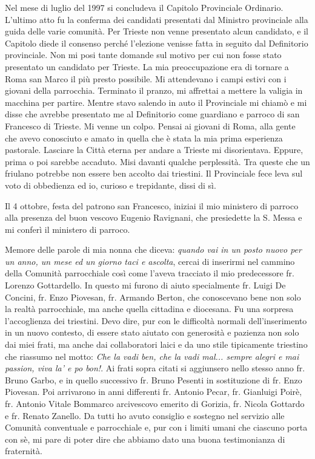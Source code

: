 \noindent Nel mese di luglio del 1997 si concludeva il Capitolo Provinciale Ordinario. L’ultimo atto fu la 
conferma dei candidati presentati dal Ministro provinciale alla guida delle varie comunità. Per 
Trieste non venne presentato alcun candidato, e il Capitolo diede il consenso perché l’elezione 
venisse fatta in seguito dal Definitorio provinciale. Non mi posi tante domande sul motivo per 
cui non fosse stato presentato un candidato per Trieste. La mia preoccupazione era di tornare a 
Roma san Marco il più presto possibile. Mi attendevano i campi estivi con i giovani della 
parrocchia. Terminato il pranzo, mi affrettai a mettere la valigia in macchina per partire. Mentre 
stavo salendo in auto il Provinciale mi chiamò e mi disse che avrebbe presentato me al 
Definitorio come guardiano e parroco di san Francesco di Trieste. Mi venne un colpo. Pensai ai 
giovani di Roma, alla gente che avevo conosciuto e amato in quella che è stata la mia prima 
esperienza pastorale. Lasciare la Città eterna per andare a Trieste mi disorientava. Eppure, prima 
o poi sarebbe accaduto. Misi davanti qualche perplessità. Tra queste che un friulano potrebbe 
non essere ben accolto dai triestini. Il Provinciale fece leva sul voto di obbedienza ed io, curioso 
e trepidante, dissi di sì.

Il 4 ottobre, festa del patrono san Francesco, iniziai il mio ministero di parroco alla presenza del 
buon vescovo Eugenio Ravignani, che presiedette la S. Messa e mi conferì il ministero di 
parroco.

Memore delle parole di mia nonna che diceva: \textit{quando vai in un posto nuovo per un anno, un
mese ed un giorno taci e ascolta}, cercai di inserirmi nel cammino della Comunità parrocchiale
così come l’aveva tracciato il mio predecessore fr. Lorenzo Gottardello. In questo mi furono di 
aiuto specialmente fr. Luigi De Concini, fr. Enzo Piovesan, fr. Armando Berton, che 
conoscevano bene non solo la realtà parrocchiale, ma anche quella cittadina e diocesana.
Fu una sorpresa l’accoglienza dei triestini. Devo dire, pur con le difficoltà normali 
dell’inserimento in un nuovo contesto, di essere stato aiutato con generosità e pazienza non solo 
dai miei frati, ma anche dai collaboratori laici e da uno stile tipicamente triestino che riassumo 
nel motto: \flqq\textit{Che la vadi ben, che la vadi mal... sempre alegri e mai passion, viva la' e po bon!}\frqq.
Ai frati sopra citati si aggiunsero nello stesso anno fr. Bruno Garbo, e in quello successivo fr. 
Bruno Pesenti in sostituzione di fr. Enzo Piovesan. Poi arrivarono in anni differenti fr. Antonio 
Pecar, fr. Gianluigi Poirè, fr. Antonio Vitale Bommarco arcivescovo emerito di Gorizia, fr. 
Nicola Gottardo e fr. Renato Zanello. Da tutti ho avuto consiglio e sostegno nel servizio alle 
Comunità conventuale e parrocchiale e, pur con i limiti umani che ciascuno porta con sè, mi pare 
di poter dire che abbiamo dato una buona testimonianza di fraternità.


